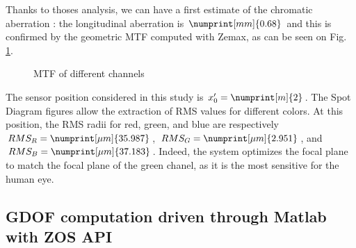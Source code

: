 \documentclass[10pt,letterpaper]{article}
\begin{document}
Thanks to thoses analysis, we can have a first estimate of the chromatic aberration : the longitudinal aberration is $\numprint[mm]{0.68}$ and this is confirmed by the geometric MTF computed with Zemax, as can be seen on Fig. \ref{fig:fft-colors}.
\begin{figure}[h]
    \centering
	\caption{MTF of different channels }
    \label{fig:fft-colors}
\end{figure}

The sensor position considered in this study is $x'_0 = \numprint[m]{2}$. The Spot Diagram figures allow the extraction of RMS values for different colors. At this position, the RMS radii for red, green, and blue are respectively $RMS_R = \numprint[\mu m]{35.987}$, $RMS_G = \numprint[\mu m]{2.951}$, and $RMS_B = \numprint[\mu m]{37.183}$. Indeed, the system optimizes the focal plane to match the focal plane of the green chanel, as it is the most sensitive for the human eye.



\subsection{GDOF computation driven through Matlab with ZOS API}
\end{document}
